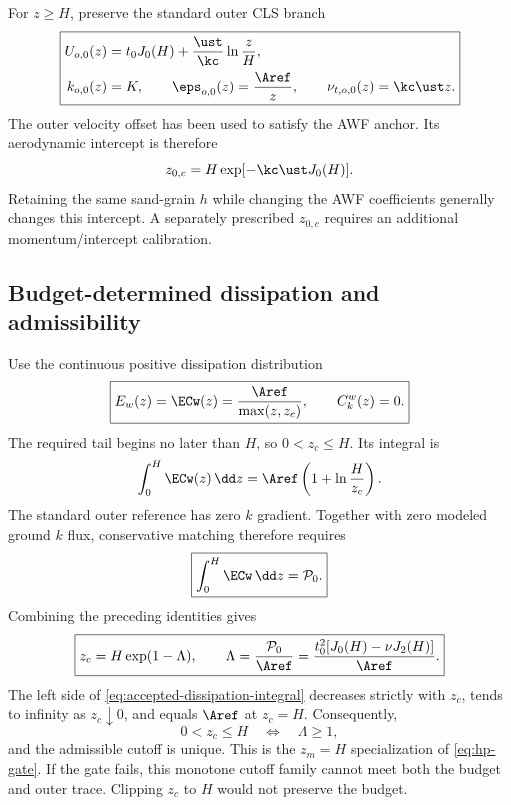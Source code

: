 For $z\geq H$, preserve the standard outer CLS branch
\begin{equation}
 \boxed{\begin{aligned}
 U_{o,0}(z)&=t_0J_0(H)+\frac{\ust}{\kc}\ln\frac zH,\\
 k_{o,0}(z)&=K,\qquad
 \eps_{o,0}(z)=\frac{\Aref}{z},\qquad
 \nu_{t,o,0}(z)=\kc\ust z.
 \end{aligned}}
 \label{eq:accepted-outer-reference}
\end{equation}
The outer velocity offset has been used to satisfy the AWF anchor.
Its aerodynamic intercept is therefore
\begin{equation}
 z_{0,c}=H\exp[-\kc\ust J_0(H)].
 \label{eq:accepted-aerodynamic-intercept}
\end{equation}
Retaining the same sand-grain $h$ while changing the AWF coefficients
generally changes this intercept. A separately prescribed $z_{0,c}$
requires an additional momentum/intercept calibration.

\subsection{Budget-determined dissipation and admissibility}
\label{app:accepted-awf-cutoff}

Use the continuous positive dissipation distribution
\begin{equation}
 \boxed{E_w(z)=\ECw(z)=\frac{\Aref}{\max(z,z_c)},
 \qquad C_k^w(z)=0.}
 \label{eq:accepted-dissipation}
\end{equation}
The required tail begins no later than $H$, so $0<z_c\leq H$.
Its integral is
\begin{equation}
 \int_0^H\ECw(z)\,\dd z
 =\Aref\left(1+\ln\frac H{z_c}\right).
 \label{eq:accepted-dissipation-integral}
\end{equation}
The standard outer reference has zero $k$ gradient. Together with
zero modeled ground $k$ flux, conservative matching therefore
requires
\begin{equation}
 \boxed{\int_0^H\ECw\,\dd z=\mathcal P_0.}
 \label{eq:accepted-budget-condition}
\end{equation}
Combining the preceding identities gives
\begin{equation}
 \boxed{z_c=H\exp(1-\Lambda),\qquad
 \Lambda=\frac{\mathcal P_0}{\Aref}
 =\frac{t_0^2[J_0(H)-\nu J_2(H)]}{\Aref}.}
 \label{eq:accepted-cutoff}
\end{equation}
The left side of \cref{eq:accepted-dissipation-integral} decreases
strictly with $z_c$, tends to infinity as $z_c\downarrow0$, and equals
$\Aref$ at $z_c=H$. Consequently,
\begin{equation}
 \boxed{0<z_c\leq H\quad\Longleftrightarrow\quad\Lambda\geq1,}
 \label{eq:accepted-cutoff-gate}
\end{equation}
and the admissible cutoff is unique. This is the $z_m=H$
specialization of \cref{eq:hp-gate}. If the gate fails, this
monotone cutoff family cannot meet both the budget and outer trace.
Clipping $z_c$ to $H$ would not preserve the budget.

